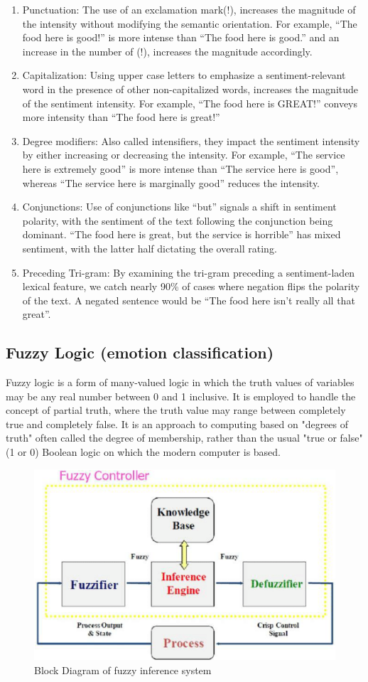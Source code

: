 \begin{enumerate}

\item	
Punctuation: The use of an exclamation mark(!), increases the magnitude of the intensity without modifying the semantic orientation. For example, “The food here is good!” is more intense than “The food here is good.” and an increase in the number of (!), increases the magnitude accordingly.
    
\item
Capitalization: Using upper case letters to emphasize a sentiment-relevant word in the presence of other non-capitalized words, increases the magnitude of the sentiment intensity. For example, “The food here is GREAT!” conveys more intensity than “The food here is great!”
\item 
Degree modifiers: Also called intensifiers, they impact the sentiment intensity by either increasing or decreasing the intensity. For example, “The service here is extremely good” is more intense than “The service here is good”, whereas “The service here is marginally good” reduces the intensity.
\item 
Conjunctions: Use of conjunctions like “but” signals a shift in sentiment polarity, with the sentiment of the text following the conjunction being dominant. “The food here is great, but the service is horrible” has mixed sentiment, with the latter half dictating the overall rating.
\item 
Preceding Tri-gram: By examining the tri-gram preceding a sentiment-laden lexical feature, we catch nearly 90\% of cases where negation flips the polarity of the text. A negated sentence would be “The food here isn’t really all that great”.
\end{enumerate}

\clearpage
\subsection{Fuzzy Logic (emotion classification)}
Fuzzy logic is a form of many-valued logic in which the truth values of variables may be any real number between 0 and 1 inclusive. It is employed to handle the concept of partial truth, where the truth value may range between completely true and completely false. It is an approach to computing based on "degrees of truth" often called the degree of membership, rather than the usual "true or false" (1 or 0) Boolean logic on which the modern computer is based.

\begin{figure}[h]
    \centering
    \includegraphics[width=0.5\linewidth]{images/fuzzy_logic.png}
    \caption{Block Diagram of fuzzy inference system}
    \label{fig:my_label}
\end{figure}

